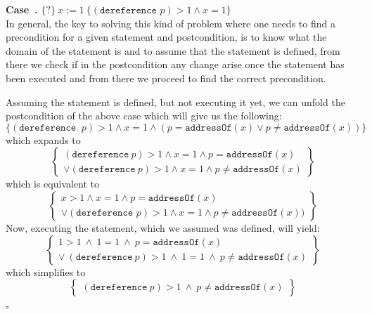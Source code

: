 \documentclass[11pt]{article}
\newcounter{case}
\newenvironment{case}[1][]{\stepcounter{case}\par\medskip\noindent
\textbf{Case~\thesection.\thecase #1} \rmfamily}{\medskip\hfill$\square$}
\newcounter{result}
\begin{document}

\begin{case} $\{\text{?}\}\ x:=1\ \{(\texttt{dereference } p)>1 \wedge x=1\}$ \\
In general, the key to solving this kind of problem where one needs to find a precondition for a given statement and postcondition, is to know what the domain of the statement is and to assume that the statement is defined, from there we check if in the postcondition any change arise once the statement has been executed and from there we proceed to find the correct precondition.

Assuming the statement is defined, but not executing it yet, we can unfold the postcondition of the above case which will give us the following:
$$\{(\texttt{dereference }\ p) > 1 \wedge x = 1 \wedge (p = \texttt{addressOf}(x) \vee p \neq \texttt{addressOf}(x))\}$$
which expands to
$$\left\{
 \begin{matrix}
(\texttt{dereference}\ p) > 1 \wedge x = 1 \wedge p = \texttt{addressOf}(x) \\ \vee (\texttt{dereference}\ p) > 1 \wedge x = 1 \wedge p \neq \texttt{addressOf}(x)
\end{matrix}
\right\}$$
which is equivalent to
$$\left\{
 \begin{matrix}
x > 1 \wedge x = 1 \wedge p = \texttt{addressOf}(x) \\ \vee (\texttt{dereference }p)> 1 \wedge x = 1 \wedge p \neq \texttt{addressOf}(x))
\end{matrix}
\right\}$$
Now, executing the statement, which we assumed was defined, will yield:
$$\left\{
 \begin{matrix}
1 > 1\ \wedge\ 1 = 1\ \wedge\ p = \texttt{addressOf}(x) \\ \vee\ (\texttt{dereference}\ p) > 1\ \wedge\ 1 = 1\ \wedge\ p \neq \texttt{addressOf}(x)\end{matrix}
\right\}$$
which simplifies to
$$\left\{
 \begin{matrix}
(\texttt{dereference}\ p) > 1\ \wedge\ p \neq \texttt{addressOf}(x)
\label{resultingpostcondition}
\end{matrix}
\right\}$$



\end{case}
\end{document}
